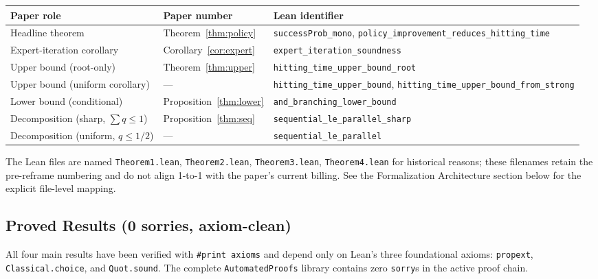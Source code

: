 \documentclass[reqno,11pt]{amsart}
\newcommand{\lean}[1]{\textup{\texttt{\small #1}}}
\theoremstyle{plain}
\theoremstyle{definition}
\theoremstyle{remark}
\begin{document}
\begin{center}
\begin{tabular}{lll}
\textbf{Paper role} & \textbf{Paper number} & \textbf{Lean identifier} \\
\hline
Headline theorem & Theorem~\ref{thm:policy} & \lean{successProb\_mono}, \lean{policy\_improvement\_reduces\_hitting\_time} \\
Expert-iteration corollary & Corollary~\ref{cor:expert} & \lean{expert\_iteration\_soundness} \\
Upper bound (root-only) & Theorem~\ref{thm:upper} & \lean{hitting\_time\_upper\_bound\_root} \\
Upper bound (uniform corollary) & --- & \lean{hitting\_time\_upper\_bound}, \lean{hitting\_time\_upper\_bound\_from\_strong} \\
Lower bound (conditional) & Proposition~\ref{thm:lower} & \lean{and\_branching\_lower\_bound} \\
Decomposition (sharp, $\sum q \le 1$) & Proposition~\ref{thm:seq} & \lean{sequential\_le\_parallel\_sharp} \\
Decomposition (uniform, $q \le 1/2$) & --- & \lean{sequential\_le\_parallel} \\
\end{tabular}
\end{center}

The Lean files are named \texttt{Theorem1.lean}, \texttt{Theorem2.lean}, \texttt{Theorem3.lean}, \texttt{Theorem4.lean} for historical reasons; these filenames retain the pre-reframe numbering and do not align 1-to-1 with the paper's current billing. See the Formalization Architecture section below for the explicit file-level mapping.

\subsection*{Proved Results (0 sorries, axiom-clean)}

All four main results have been verified with \texttt{\#print axioms} and depend only on Lean's three foundational axioms: \texttt{propext}, \texttt{Classical.choice}, and \texttt{Quot.sound}. The complete \texttt{AutomatedProofs} library contains zero \texttt{sorry}s in the active proof chain.
\end{document}

